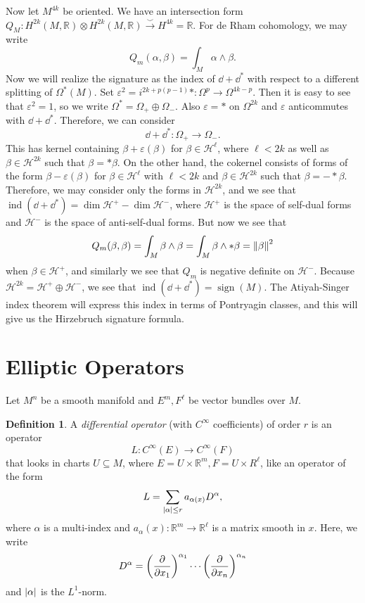 \documentclass[leqno, openany]{memoir}
\theoremstyle{definition}
\newtheorem{defn}[thm]{Definition}
\theoremstyle{remark}
\theoremstyle{plain}
\theoremstyle{definition}
\theoremstyle{remark}
\newcommand{\R}{\mathbb{R}}
\newcommand{\ep}{\varepsilon}
\newcommand{\mc}[1]{\mathcal{#1}}
\DeclareMathOperator{\sign}{sign}
\DeclareMathOperator{\ind}{ind}
\begin{document}
Now let $M^{4k}$ be oriented. We have an intersection form $Q_M \colon
H^{2k}(M, \R) \otimes H^{2k}(M, \R) \xrightarrow{\smile} H^{4k} = \R$. For de
Rham cohomology, we may write \[ Q_m(\alpha, \beta) = \int_M \alpha \wedge
\beta. \] Now we will realize the signature as the index of $\dd + \dd^*$ with
respect to a different splitting of $\Omega^*(M)$. Set $\ep^2 = i^{2k + p(p-1)}
* \colon \Omega^p \to \Omega^{4k-p}$. Then it is easy to see that $\ep^2 = 1$,
so we write $\Omega^* = \Omega_+ \oplus \Omega_-$. Also $\ep = *$ on
$\Omega^{2k}$ and $\ep$ anticommutes with $\dd + \dd^*$. Therefore, we can
consider \[ \dd + \dd^* \colon \Omega_+ \to \Omega_-. \] This has kernel
containing $\beta + \ep(\beta)$ for $\beta \in \mc{H}^{\ell}$, where $\ell <
2k$ as well as $\beta \in \mc{H}^{2k}$ such that $\beta = *\beta$. On the other
hand, the cokernel consists of forms of the form $\beta - \ep(\beta)$ for
$\beta\in \mc{H}^{\ell}$ with $\ell < 2k$ and $\beta \in \mc{H}^{2k}$ such that
$\beta = - *\beta$. Therefore, we may consider only the forms in $\mc{H}^{2k}$,
and we see that $\ind(\dd + \dd^*) = \dim \mc{H}^+ - \dim \mc{H}^-$, where
$\mc{H}^+$ is the space of self-dual forms and $\mc{H}^-$ is the space of
anti-self-dual forms. But now we see that \[ Q_m(\beta, \beta) = \int_M \beta
\wedge \beta = \int_M \beta \wedge * \beta = \norm{\beta}^2 \] when $\beta \in
\mc{H}^+$, and similarly we see that $Q_m$ is negative definite on $\mc{H}^-$.
Because $\mc{H}^{2k} = \mc{H}^+ \oplus \mc{H}^-$, we see that $\ind(\dd +
\dd^*) = \sign(M)$. The Atiyah-Singer index theorem will express this index in
terms of Pontryagin classes, and this will give us the Hirzebruch signature
formula.

\section{Elliptic Operators}%

Let $M^n$ be a smooth manifold and $E^m, F^{\ell}$ be vector bundles over $M$. 

\begin{defn} A \textit{differential operator} (with $C^{\infty}$ coefficients)
    of order $r$ is an operator \[ L \colon C^{\infty}(E) \to C^{\infty}(F) \]
    that looks in charts $U \subseteq M$, where $E = U \times \R^m, F = U
    \times R^{\ell}$, like an operator of the form \[ L = \sum_{\abs{\alpha}
        \leq r} a_{\alpha(x)} D^{\alpha}, \] where $\alpha$ is a multi-index
        and $a_{\alpha}(x) \colon \R^m \to \R^{\ell}$ is a matrix smooth in
        $x$. Here, we write \[ D^{\alpha} = {\qty(\pdv{x_1})}^{\alpha_1} \cdots
        {\qty(\pdv{x_n})}^{\alpha_n} \] and $\abs{\alpha}$ is the $L^1$-norm.
    \end{defn}
\end{document}
